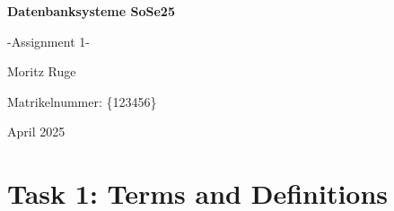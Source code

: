 \documentclass[10pt,a4paper]{article}
\begin{document}
\begin{titlepage}
    \centering
    \vspace*{3cm}
    {\Huge\bfseries Datenbanksysteme SoSe25 \par}
    \vspace{0.5cm}
    {\Huge -Assignment 1- \par}
    \vspace{1cm}
    {\Large Moritz Ruge \par}
    \vspace{1cm}
    {\large Matrikelnummer: \{123456\} \par}
    \vfill
    {\large April 2025}
\end{titlepage}



\section*{Task 1: Terms and Definitions}
\end{document}
